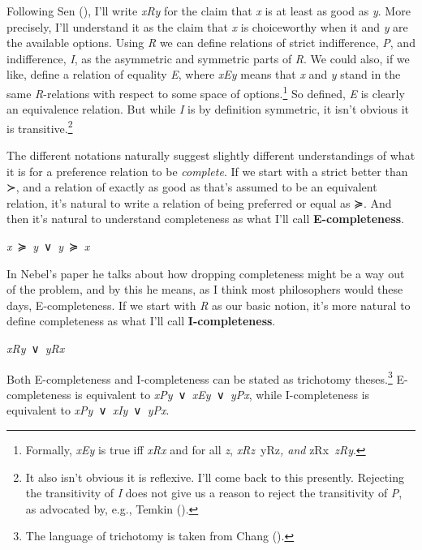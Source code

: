 \documentclass[
  11pt,
  letterpaper,
  DIV=11,
  numbers=noendperiod,
  twoside]{scrartcl}
\providecommand{\tightlist}{%
  \setlength{\itemsep}{0pt}\setlength{\parskip}{0pt}}
\begin{document}
Following Sen (), I'll write
\emph{xRy} for the claim that \emph{x} is at least as good as \emph{y}.
More precisely, I'll understand it as the claim that \emph{x} is
choiceworthy when it and \emph{y} are the available options. Using
\emph{R} we can define relations of strict indifference, \emph{P}, and
indifference, \emph{I}, as the asymmetric and symmetric parts of
\emph{R}. We could also, if we like, define a relation of equality
\emph{E}, where \emph{xEy} means that \emph{x} and \emph{y} stand in the
same \emph{R}-relations with respect to some space of
options.\footnote{Formally, \emph{xEy} is true iff \emph{xRx} and for
  all \emph{z}, \emph{xRz}~\leftrightarrow *yRz\emph{, and
  }zRx\emph{~\leftrightarrow *zRy}.} So defined, \emph{E} is clearly an
equivalence relation. But while \emph{I} is by definition symmetric, it
isn't obvious it is transitive.\footnote{It also isn't obvious it is
  reflexive. I'll come back to this presently. Rejecting the
  transitivity of \emph{I} does not give us a reason to reject the
  transitivity of \emph{P}, as advocated by, e.g., Temkin
  ().}

The different notations naturally suggest slightly different
understandings of what it is for a preference relation to be
\emph{complete}. If we start with a strict better than ≻, and a relation
of exactly as good as that's assumed to be an equivalent relation, it's
natural to write a relation of being preferred or equal as ≽. And then
it's natural to understand completeness as what I'll call
\textbf{E-completeness}.

\begin{description}
\tightlist
\item[E-completeness]
\emph{x}~≽~\emph{y}~∨~\emph{y}~≽~\emph{x}
\end{description}

In Nebel's paper he talks about how dropping completeness might be a way
out of the problem, and by this he means, as I think most philosophers
would these days, E-completeness. If we start with \emph{R} as our basic
notion, it's more natural to define completeness as what I'll call
\textbf{I-completeness}.

\begin{description}
\tightlist
\item[I-completeness]
\emph{xRy}~∨~\emph{yRx}
\end{description}

Both E-completeness and I-completeness can be stated as trichotomy
theses.\footnote{The language of trichotomy is taken from Chang
  ().} E-completeness is equivalent to
\emph{xPy}~∨~\emph{xEy}~∨~\emph{yPx}, while I-completeness is equivalent
to \emph{xPy}~∨~\emph{xIy}~∨~\emph{yPx}.
\end{document}
